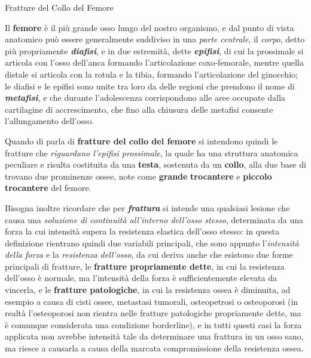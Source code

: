 \documentclass[]{article}
\date{}
\begin{document}
Fratture del Collo del Femore

Il \textbf{femore} è il più grande osso lungo del nostro organismo, e
dal punto di vista anatomico può essere generalmente suddiviso in una
\emph{parte centrale}, il \emph{corpo}, detto più propriamente
\textbf{\emph{diafisi}}, e in due estremità, dette
\textbf{\emph{epifisi}}, di cui la prossimale si articola con l'osso
dell'anca formando l'articolazione coxo-femorale, mentre quella distale
si articola con la rotula e la tibia, formando l'articolazione del
ginocchio; le diafisi e le epifisi sono unite tra loro da delle regioni
che prendono il nome di \textbf{\emph{metafisi}}, e che durante
l'adolescenza corrispondono alle aree occupate dalla cartilagine di
accrescimento, che fino alla chiusura delle metafisi consente
l'allungamento dell'osso.

Quando di parla di \textbf{fratture del collo del femore} si intendono
quindi le fratture che \emph{riguardano l'epifisi prossimale}, la quale
ha una struttura anatomica peculiare e risulta costituita da una
\textbf{testa}, sostenuta da un \textbf{collo}, alla due base di trovano
due prominenze ossee, note come \textbf{grande} \textbf{trocantere} e
\textbf{piccolo} \textbf{trocantere} del femore.

Bisogna inoltre ricordare che per \textbf{\emph{frattura}} si intende
una qualsiasi lesione che causa una \emph{soluzione di continuità
all'interno dell'osso stesso}, determinata da una forza la cui intensità
supera la resistenza elastica dell'osso stesso: in questa definizione
rientrano quindi due variabili principali, che sono appunto
l'\emph{intensità della forza} e la \emph{resistenza dell'osso}, da cui
deriva anche che esistono due forme principali di fratture, le
\textbf{fratture propriamente dette}, in cui la resistenza dell'osso è
normale, ma l'intensità della forza è sufficientemente elevata da
vincerla, e le \textbf{fratture patologiche}, in cui la resistenza ossea
è diminuita, ad esempio a causa di cisti ossee, metastasi tumorali,
osteopetrosi o osteoporosi (in realtà l'osteoporosi non rientra nelle
fratture patologiche propriamente dette, ma è comunque considerata una
condizione borderline), e in tutti questi casi la forza applicata non
avrebbe intensità tale da determinare una frattura in un osso sano, ma
riesce a causarla a causa della marcata compromissione della resistenza
ossea.
\end{document}
